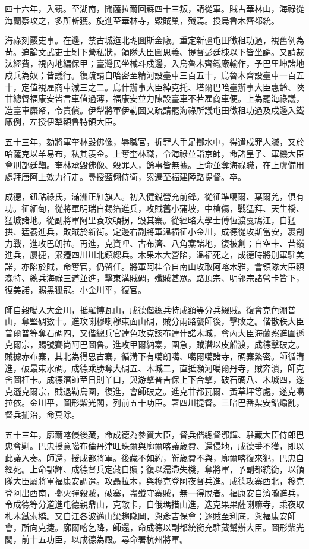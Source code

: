 \begin{pinyinscope}
四十六年，入覲。至湖南，聞薩拉爾回蘇四十三叛，請從軍。賊占華林山，海祿從海蘭察攻之，多所斬獲。旋進至華林寺，毀賊巢，殲焉。授烏魯木齊都統。

海祿刻覈吏事。在邊，禁古城迤北瑚圖斯金廠。重定新疆屯田徵租功過，視舊例為苛。追論文武吏士剝下營私狀，領隊大臣圖思義、提督彭廷棟以下皆坐譴。又請裁汰經費，視內地編保甲；臺灣民坐械斗戍邊，入烏魯木齊鐵廠輸作，予巴里坤諸地戍兵為奴；皆議行。復疏請自哈密至精河設臺車三百五十，烏魯木齊設臺車一百五十，定值視雇商車減三之二。烏什辦事大臣綽克托、塔爾巴哈臺辦事大臣惠齡、陜甘總督福康安皆言車值過薄，福康安並力陳設臺車不若雇商車便。上為罷海祿議，造臺車糜帑，令責償。伊犁將軍伊勒圖又疏請罷海祿所議屯田徵租功過及戍邊入鐵廠例，左授伊犁額魯特領大臣。

五十三年，劾將軍奎林毀佛像，辱職官，折罪人手足擲水中，得遣戍罪人贓，又於哈薩克以羊易布，私其羨金。上奪奎林職，令海祿並詣京師，命諸皇子、軍機大臣會刑部廷鞫。奎林承毀佛像、殺罪人，餘事皆無據。上命並奪海祿職，在上虞備用處拜唐阿上效力行走。尋授藍翎侍衛，累遷至福建陸路提督。卒。

成德，鈕祜祿氏，滿洲正紅旗人。初入健銳營充前鋒。從征準噶爾、葉爾羌，俱有功。征緬甸，從將軍明瑞自錫箔進兵，攻賊舊小蒲坡，中槍傷，戰猛拜、天生橋、猛城諸地。從副將軍阿里袞攻頓拐，毀其寨。從經略大學士傅恆渡戛鳩江，自猛拱、猛養進兵，敗賊於新街。定邊右副將軍溫福征小金川，成德從攻斯當安，裹創力戰，進攻巴朗拉。再進，克資哩、古布濟、八角寨諸地，復被創；自空卡、昔嶺進兵，屢捷，累遷四川川北鎮總兵。木果木大營陷，溫福死之，成德時將別軍駐美諾，亦陷於賊，命奪官，仍留任。將軍阿桂令自南山攻取阿喀木雅，會領隊大臣額森特、總兵海祿三道並進，擊東溝賊碉，殲賊甚眾。路頂宗、明郭宗諸營卡皆下，復美諾，賜黑狐冠。小金川平，復官。

師自穀噶入大金川，抵羅博瓦山，成德偕總兵特成額等分兵綴賊。復會克色淜普山，奪堅碉數十。進攻喇穆喇穆東面山碉，賊分兩路襲師後，擊敗之。偕散秩大臣普爾普等奪石碉四，又偕總兵官達色攻克該布達什諾木城，會內大臣海蘭察進圍遜克爾宗，賜號賽尚阿巴圖魯。進攻甲爾納寨，圍急，賊潛以皮船渡，成德擊破之。賊據赤布寨，其北為得思古寨，循溝下有噶朗噶、噶爾噶諸寺，碉寨繁密。師循溝進，破最東水碉。成德乘勝奪大碉五、木城二，直抵瀕河噶爾丹寺，賊奔潰，師克舍圖枉卡。成德潛師至日則丫口，與游擊普吉保上下合擊，破石碉八、木城四，遂克遜克爾宗，賊退勒烏圍，復進，會師破之。進克甘都瓦爾、黃草坪等處，遂克噶拉依。金川平，圖形紫光閣，列前五十功臣。署四川提督。三暗巴番渠安錯煽亂，督兵捕治，命真除。

五十三年，廓爾喀侵後藏，命成德為參贊大臣，督兵偕總督鄂輝、駐藏大臣侍郎巴忠會剿。巴忠授意噶布倫丹津旺珠爾與廓爾喀議歲費、還侵地，成德爭不獲，即以此議入奏。師還，授成都將軍。後藏不如約，靳歲費不與，廓爾喀復來犯，巴忠自經死。上命鄂輝、成德督兵定藏自贖；復以濡滯失機，奪將軍，予副都統銜，以領隊大臣屬將軍福康安調遣。攻聶拉木，與穆克登阿夜督兵進。成德攻寨西北，穆克登阿出西南，擲火彈殺賊，破寨，盡殲守寨賊，無一得脫者。福康安自濟嚨進兵，令成德等分道進屯德親鼎山，克敵卡，自俄瑪措山進，迭克果果薩喇嘛寺，乘夜取札木鐵索橋。又自江各波邁山梁趨隴岡，與彥吉保會；逐賊至利底，與福康安師會，所向克捷。廓爾喀乞降，師還，命成德以副都統銜充駐藏幫辦大臣。圖形紫光閣，前十五功臣，以成德為殿。尋命署杭州將軍。


\end{pinyinscope}
